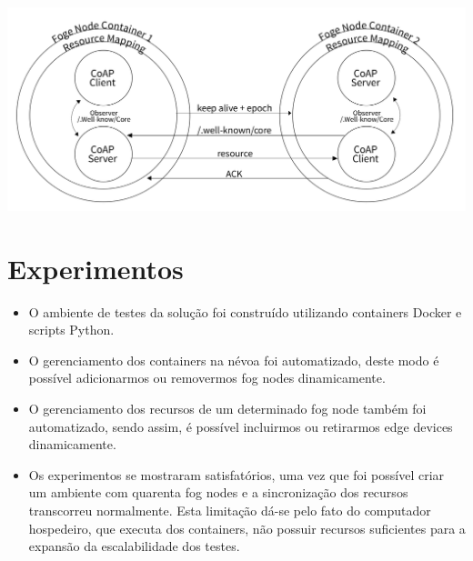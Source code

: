 \documentclass[a0,portrait]{lab-poster}
\begin{document}
\begin{multicols}{2}
\begin{itemize}
\end{itemize}

\begin{center}
    \includegraphics[width=0.7\linewidth]{fig/fig3.png}
\end{center}

\section*{\huge Experimentos}

\Large
\justifying
\begin{itemize}

\item O ambiente de testes da solução foi construído utilizando containers Docker e scripts Python.
\item O gerenciamento dos containers na névoa foi automatizado, deste modo é possível adicionarmos ou removermos fog nodes dinamicamente.
\item O gerenciamento dos recursos de um determinado fog node também foi automatizado, sendo assim, é possível incluirmos ou retirarmos edge devices dinamicamente.
\item Os experimentos se mostraram satisfatórios, uma vez que foi possível criar um ambiente com quarenta fog nodes e a sincronização dos recursos transcorreu normalmente.
Esta limitação dá-se pelo fato do computador hospedeiro, que executa dos containers, não possuir recursos suficientes para a expansão da escalabilidade dos testes.



\end{itemize}
\vspace{-10mm}
\large
\color{NavyBlue}
\color{Black}
\raggedright



\end{multicols}

\end{document}
